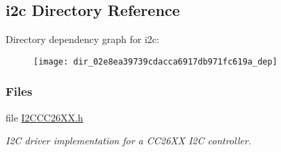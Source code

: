 \subsection{i2c Directory Reference}
\label{dir_02e8ea39739cdacca6917db971fc619a}
Directory dependency graph for i2c\+:
\nopagebreak
\begin{figure}[H]
\begin{center}
\leavevmode
\texttt{[image: dir\_02e8ea39739cdacca6917db971fc619a\_dep]}
\end{center}
\end{figure}
\subsubsection*{Files}
\begin{DoxyCompactItemize}
\item 
file \hyperlink{_i2_c_c_c26_x_x_8h}{I2\+C\+C\+C26\+X\+X.\+h}
\begin{DoxyCompactList}\small\item\em I2\+C driver implementation for a C\+C26\+X\+X I2\+C controller. \end{DoxyCompactList}\end{DoxyCompactItemize}
